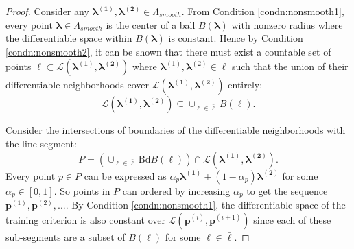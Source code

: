 \documentclass[10pt]{book}
\theoremstyle{definition}
\begin{document}
\begin{proof}
	Consider any $\boldsymbol{\lambda^{(1)}},\boldsymbol{\lambda^{(2)}}\in\Lambda_{smooth}$. 
	From Condition \ref{condn:nonsmooth1}, every point $\boldsymbol{\lambda} \in \Lambda_{smooth}$ is the center of a ball $B(\boldsymbol{\lambda})$ with nonzero radius where the differentiable space within $B(\boldsymbol{\lambda})$ is constant.
	Hence by Condition \ref{condn:nonsmooth2}, it can be shown that there must exist a countable
	set of points $\bar{\boldsymbol{\ell}} 
	\subset\mathcal{L}(\boldsymbol{\lambda^{(1)}},\boldsymbol{\lambda^{(2)}})$ where $\boldsymbol{\lambda}^{(1)}, \boldsymbol{\lambda}^{(2)} \in \bar{\boldsymbol{\ell}}$
	such that the union of their differentiable neighborhoods cover  $\mathcal{L}(\boldsymbol{\lambda^{(1)}},\boldsymbol{\lambda^{(2)}})$ entirely:
	\[
	\mathcal{L}\left(\boldsymbol{\lambda^{(1)}},\boldsymbol{\lambda^{(2)}}\right) \subseteq \cup_{\ell \in \bar{\boldsymbol{\ell}}}B(\boldsymbol{\ell}).
	\]
	
	Consider the intersections of boundaries of the differentiable neighborhoods with the line segment:
	\[
	P=
	\left ( 
	\cup_{\ell \in \bar{\boldsymbol{\ell}}}
	\mbox{Bd}B\left(\boldsymbol{\ell}\right)
	\right )
	\cap\mathcal{L}(\boldsymbol{\lambda^{(1)}},\boldsymbol{\lambda^{(2)}}).
	\]
	Every point $p\in P$ can be expressed as $\alpha_{p}\boldsymbol{\lambda^{(1)}}+(1-\alpha_{p})\boldsymbol{\lambda^{(2)}}$
	for some $\alpha_{p}\in[0,1]$. So points in $P$ can ordered by increasing $\alpha_{p}$ to get the sequence $\boldsymbol{p}^{(1)}, \boldsymbol{p}^{(2)}, ... $.
	By Condition \ref{condn:nonsmooth1}, the differentiable space of the training criterion
	is also constant over $\mathcal{L}\left(\boldsymbol{p}^{(i)},\boldsymbol{p}^{(i+1)}\right)$ since each of these sub-segments are a subset of $B(\boldsymbol{\ell})$ for some $\boldsymbol{\ell} \in \bar{\boldsymbol{\ell}}$. 
	

\end{proof}
\end{document}

